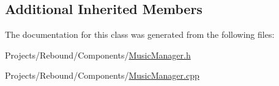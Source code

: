 \subsection*{Additional Inherited Members}


The documentation for this class was generated from the following files\-:\begin{DoxyCompactItemize}
\item 
Projects/\-Rebound/\-Components/\hyperlink{MusicManager_8h}{Music\-Manager.\-h}\item 
Projects/\-Rebound/\-Components/\hyperlink{MusicManager_8cpp}{Music\-Manager.\-cpp}\end{DoxyCompactItemize}
